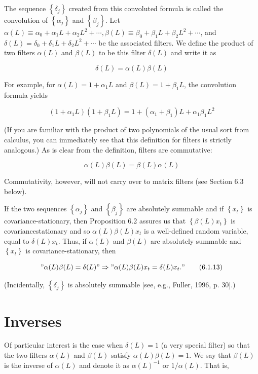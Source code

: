 \documentclass[10pt]{article}
\begin{document}
The sequence $\left\{\delta_{j}\right\}$ created from this convoluted formula is called the convolution of $\left\{\alpha_{j}\right\}$ and $\left\{\beta_{j}\right\}$. Let $\alpha(L) \equiv \alpha_{0}+\alpha_{1} L+\alpha_{2} L^{2}+\cdots, \beta(L) \equiv \beta_{0}+\beta_{1} L+\beta_{2} L^{2}+\cdots$, and $\delta(L)=\delta_{0}+\delta_{1} L+\delta_{2} L^{2}+\cdots$ be the associated filters. We define the product of two filters $\alpha(L)$ and $\beta(L)$ to be this filter $\delta(L)$ and write it as

$$
\delta(L)=\alpha(L) \beta(L)
$$

For example, for $\alpha(L)=1+\alpha_{1} L$ and $\beta(L)=1+\beta_{1} L$, the convolution formula yields

$$
\left(1+\alpha_{1} L\right)\left(1+\beta_{1} L\right)=1+\left(\alpha_{1}+\beta_{1}\right) L+\alpha_{1} \beta_{1} L^{2}
$$

(If you are familiar with the product of two polynomials of the usual sort from calculus, you can immediately see that this definition for filters is strictly analogous.) As is clear from the definition, filters are commutative:

$$
\alpha(L) \beta(L)=\beta(L) \alpha(L)
$$

Commutativity, however, will not carry over to matrix filters (see Section 6.3 below).

If the two sequences $\left\{\alpha_{j}\right\}$ and $\left\{\beta_{j}\right\}$ are absolutely summable and if $\left\{x_{t}\right\}$ is covariance-stationary, then Proposition 6.2 assures us that $\left\{\beta(L) x_{t}\right\}$ is covariancestationary and so $\alpha(L) \beta(L) x_{t}$ is a well-defined random variable, equal to $\delta(L) x_{t}$. Thus, if $\alpha(L)$ and $\beta(L)$ are absolutely summable and $\left\{x_{t}\right\}$ is covariance-stationary, then


\begin{equation*}
" \alpha(L) \beta(L)=\delta(L) " \Rightarrow " \alpha(L) \beta(L) x_{t}=\delta(L) x_{t} . " \tag{6.1.13}
\end{equation*}


(Incidentally, $\left\{\delta_{j}\right\}$ is absolutely summable [see, e.g., Fuller, 1996, p. 30].)

\section*{Inverses}
Of particular interest is the case when $\delta(L)=1$ (a very special filter) so that the two filters $\alpha(L)$ and $\beta(L)$ satisfy $\alpha(L) \beta(L)=1$. We say that $\beta(L)$ is the inverse of $\alpha(L)$ and denote it as $\alpha(L)^{-1}$ or $1 / \alpha(L)$. That is,
\end{document}
